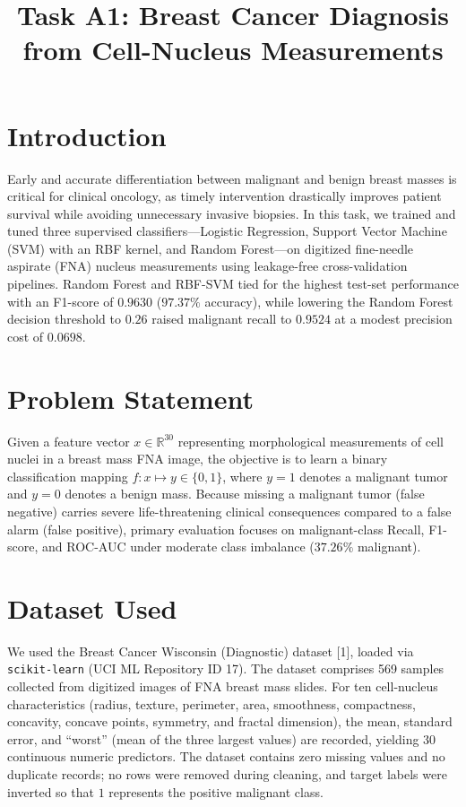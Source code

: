 \documentclass[10pt,twocolumn,a4paper]{IEEEtran}
\title{Task A1: Breast Cancer Diagnosis from Cell-Nucleus Measurements}
\author{
    \IEEEauthorblockN{KAINAT \quad Roll No. 70176544 \quad | \quad Section C}
    \IEEEauthorblockA{
        Department of Intelligent Systems, The University of Lahore \\
        AI-101 Introduction to Artificial Intelligence \quad | \quad Instructor: Dr. Muhammad Awais, AI Architect \\
        Repository: \url{https://github.com/70176544-sketch/AI101-ML-Assignment-70176544}
    }
}
\begin{document}
\maketitle

\section{Introduction}
Early and accurate differentiation between malignant and benign breast masses is critical for clinical oncology, as timely intervention drastically improves patient survival while avoiding unnecessary invasive biopsies. In this task, we trained and tuned three supervised classifiers---Logistic Regression, Support Vector Machine (SVM) with an RBF kernel, and Random Forest---on digitized fine-needle aspirate (FNA) nucleus measurements using leakage-free cross-validation pipelines. Random Forest and RBF-SVM tied for the highest test-set performance with an F1-score of $0.9630$ ($97.37\%$ accuracy), while lowering the Random Forest decision threshold to $0.26$ raised malignant recall to $0.9524$ at a modest precision cost of $0.0698$.

\section{Problem Statement}
Given a feature vector $x \in \mathbb{R}^{30}$ representing morphological measurements of cell nuclei in a breast mass FNA image, the objective is to learn a binary classification mapping $f: x \mapsto y \in \{0, 1\}$, where $y=1$ denotes a malignant tumor and $y=0$ denotes a benign mass. Because missing a malignant tumor (false negative) carries severe life-threatening clinical consequences compared to a false alarm (false positive), primary evaluation focuses on malignant-class Recall, F1-score, and ROC-AUC under moderate class imbalance ($37.26\%$ malignant).

\section{Dataset Used}
We used the Breast Cancer Wisconsin (Diagnostic) dataset [1], loaded via \texttt{scikit-learn} (UCI ML Repository ID 17). The dataset comprises 569 samples collected from digitized images of FNA breast mass slides. For ten cell-nucleus characteristics (radius, texture, perimeter, area, smoothness, compactness, concavity, concave points, symmetry, and fractal dimension), the mean, standard error, and ``worst'' (mean of the three largest values) are recorded, yielding 30 continuous numeric predictors. The dataset contains zero missing values and no duplicate records; no rows were removed during cleaning, and target labels were inverted so that $1$ represents the positive malignant class.
\end{document}
